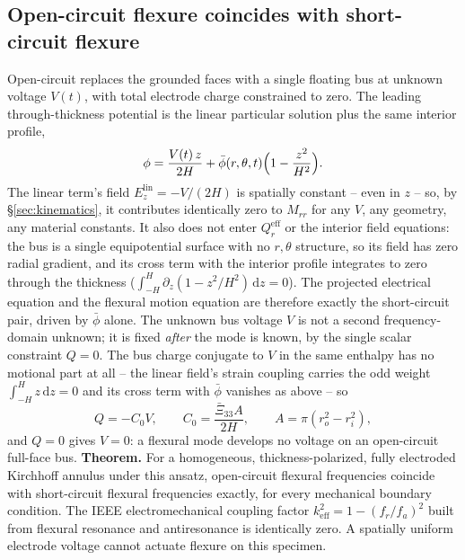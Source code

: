 \documentclass[11pt]{article}
\newcommand{\Xibar}{\bar{\Xi}_{33}}
\begin{document}
\subsection{Open-circuit flexure coincides with short-circuit flexure}
\label{sec:oc}
Open-circuit replaces the grounded faces with a single floating bus at
unknown voltage $V(t)$, with total electrode charge constrained to zero.
The leading through-thickness potential is the linear particular
solution plus the same interior profile,
\begin{equation}
\phi=\frac{V(t)\,z}{2H}+\bar\phi(r,\theta,t)\Bigl(1-\frac{z^2}{H^2}\Bigr).
\label{eq:phi-oc}
\end{equation}
The linear term's field $E_z^{\mathrm{lin}}=-V/(2H)$ is spatially
constant -- even in $z$ -- so, by \S\ref{sec:kinematics}, it contributes
identically zero to $M_{rr}$ for any $V$, any geometry, any material
constants. It also does not enter $Q_r^{\mathrm{eff}}$ or the interior field equations:
the bus is a single equipotential surface with no $r,\theta$ structure,
so its field has zero radial gradient, and its cross term with the
interior profile integrates to zero through the thickness
($\int_{-H}^{H}\partial_z(1-z^2/H^2)\,\mathrm dz=0$). The projected
electrical equation and the flexural motion equation are therefore
exactly the short-circuit pair, driven by $\bar\phi$ alone. The unknown
bus voltage $V$ is not a second frequency-domain unknown; it is fixed
\emph{after} the mode is known, by the single scalar constraint $Q=0$.
The bus charge conjugate to $V$ in the same enthalpy has no motional
part at all -- the linear field's strain coupling carries the odd
weight $\int_{-H}^{H}z\,\mathrm dz=0$ and its cross term with
$\bar\phi$ vanishes as above -- so
\begin{equation}
Q=-C_0V,\qquad
C_0=\frac{\Xibar A}{2H},\qquad A=\pi(r_o^2-r_i^2),
\label{eq:Vsensor}
\end{equation}
and $Q=0$ gives $V=0$: a flexural mode develops no voltage on an
open-circuit full-face bus.
\textbf{Theorem.} For a homogeneous, thickness-polarized, fully
electroded Kirchhoff annulus under this ansatz, open-circuit flexural
frequencies coincide with short-circuit flexural frequencies exactly, for
every mechanical boundary condition. The IEEE electromechanical coupling
factor $k_{\mathrm{eff}}^2=1-(f_r/f_a)^2$ built from flexural resonance
and antiresonance is identically zero. A spatially uniform electrode
voltage cannot actuate flexure on this specimen.
\end{document}
